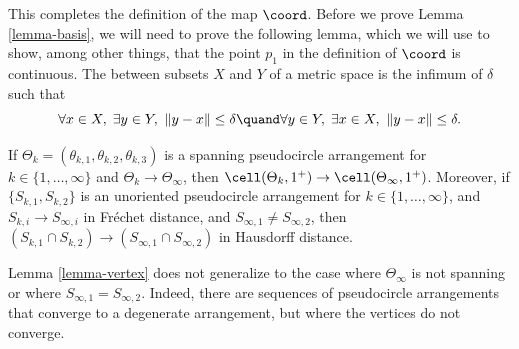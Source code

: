 This completes the definition of the map $\coord$. Before we prove Lemma \ref{lemma-basis}, we will need to prove the following lemma, which we will use to show, among other things, that the point $p_1$ in the definition of $\coord$ is continuous.
The  between subsets $X$ and $Y$ of a metric space is the infimum of $\delta$ such that
\[
\forall x \in X,\; \exists y \in Y,\ \|y-x\| \leq \delta \quand\forall y \in Y,\; \exists x \in X,\ \|y-x\| \leq \delta .
\]

\begin{lemma}\label{lemma-vertex}
If $\Theta_k = (\theta_{k,1},\theta_{k,2},\theta_{k,3})$ is a spanning pseudocircle arrangement for $k\in \{1,\dots,\infty\}$ and $\Theta_k \to \Theta_\infty$, then $\cell(\Theta_k,1^+) \to \cell(\Theta_\infty,1^+)$.
Moreover, if $\{S_{k,1}, S_{k,2}\}$ is an unoriented pseudocircle arrangement for $k\in \{1,\dots,\infty\}$, and $S_{k,i} \to S_{\infty,i}$ in Fréchet distance, and $S_{\infty,1}\neq S_{\infty,2}$, then $(S_{k,1}\cap S_{k,2}) \to (S_{\infty,1}\cap S_{\infty,2})$ in Hausdorff distance.
\end{lemma}

\begin{warning}
Lemma \ref{lemma-vertex} does not generalize to the case where $\Theta_\infty$ is not spanning or where $S_{\infty,1} = S_{\infty,2}$.
Indeed, there are sequences of pseudocircle arrangements that converge to a degenerate arrangement, but where the vertices do not converge.
\end{warning}

